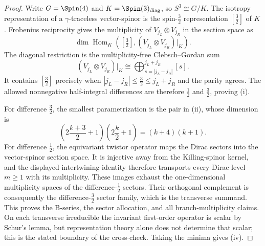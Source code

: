 \documentclass[11pt,a4paper]{article}
\begin{document}
\begin{proof}
Write \(G=\Spin(4)\) and \(K=\Spin(3)_{\rm diag}\), so
\(S^3\cong G/K\).  The isotropy representation of a
\(\gamma\)-traceless vector-spinor is the spin-\(\tfrac32\) representation
\([\tfrac32]\) of \(K\).  Frobenius reciprocity gives the multiplicity of
\(V_{j_L}\otimes V_{j_R}\) in the section space as
\[
\dim\operatorname{Hom}_{K}
\left(
[\tfrac32],
(V_{j_L}\otimes V_{j_R})|_K
\right).
\]
The diagonal restriction is the multiplicity-free Clebsch--Gordan sum
\[
(V_{j_L}\otimes V_{j_R})|_K
\cong
\bigoplus_{s=|j_L-j_R|}^{j_L+j_R}[s].
\]
It contains \([\tfrac32]\) precisely when
\(|j_L-j_R|\le\tfrac32\le j_L+j_R\) and the parity agrees.  The allowed
nonnegative half-integral differences are therefore
\(\tfrac12\) and \(\tfrac32\), proving (i).

For difference \(\tfrac32\), the smallest parametrization is the pair in
(ii), whose dimension is
\[
\left(2\frac{k+3}{2}+1\right)
\left(2\frac{k}{2}+1\right)
=(k+4)(k+1).
\]
For difference \(\tfrac12\), the equivariant twistor operator maps the
Dirac sectors into the vector-spinor section space.  It is injective away
from the Killing-spinor kernel, and the displayed intertwining identity
therefore transports every Dirac level \(m\ge1\) with its multiplicity.
These images exhaust the one-dimensional multiplicity spaces of the
difference-\(\tfrac12\) sectors.  Their orthogonal complement is consequently
the difference-\(\tfrac32\) sector family, which is the transverse summand.
This proves the B-series, the sector allocation, and all branch-multiplicity
claims.
On each transverse irreducible the invariant first-order operator is scalar
by Schur's lemma, but representation theory alone does not determine that
scalar; this is the stated boundary of the cross-check.  Taking the minima
gives (iv).
\end{proof}
\end{document}
